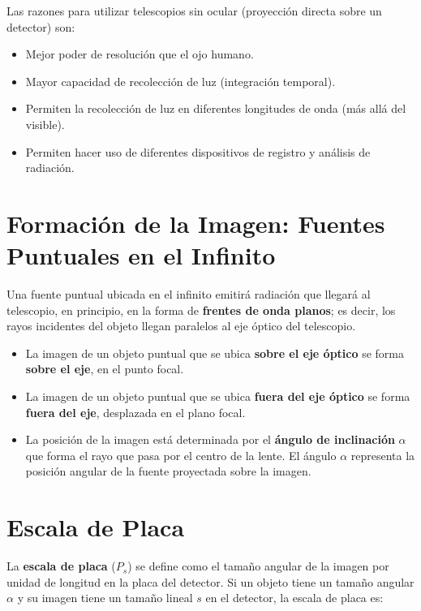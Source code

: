 Las razones para utilizar telescopios sin ocular (proyección directa sobre un detector) son:

\begin{itemize}
    \item Mejor poder de resolución que el ojo humano.
    \item Mayor capacidad de recolección de luz (integración temporal).
    \item Permiten la recolección de luz en diferentes longitudes de onda (más allá del visible).
    \item Permiten hacer uso de diferentes dispositivos de registro y análisis de radiación.
\end{itemize}

\section{Formación de la Imagen: Fuentes Puntuales en el Infinito}

Una fuente puntual ubicada en el infinito emitirá radiación que llegará al telescopio, en principio, en la forma de \textbf{frentes de onda planos}; es decir, los rayos incidentes del objeto llegan paralelos al eje óptico del telescopio.

\begin{itemize}
    \item La imagen de un objeto puntual que se ubica \textbf{sobre el eje óptico} se forma \textbf{sobre el eje}, en el punto focal.
    \item La imagen de un objeto puntual que se ubica \textbf{fuera del eje óptico} se forma \textbf{fuera del eje}, desplazada en el plano focal.
    \item La posición de la imagen está determinada por el \textbf{ángulo de inclinación} $\alpha$ que forma el rayo que pasa por el centro de la lente. El ángulo $\alpha$ representa la posición angular de la fuente proyectada sobre la imagen.
\end{itemize}





\section{Escala de Placa}

La \textbf{escala de placa} ($P_s$) se define como el tamaño angular de la imagen por unidad de longitud en la placa del detector. Si un objeto tiene un tamaño angular $\alpha$ y su imagen tiene un tamaño lineal $s$ en el detector, la escala de placa es:

